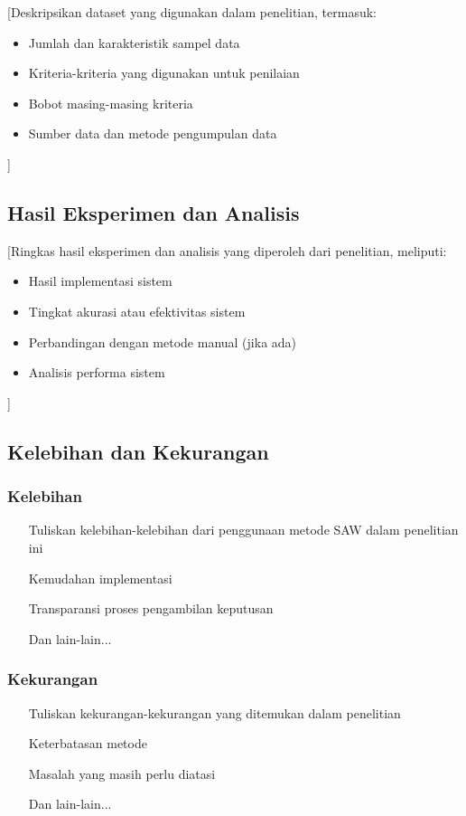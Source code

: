 \documentclass[10pt,a4paper]{article}
\begin{document}
[Deskripsikan dataset yang digunakan dalam penelitian, termasuk:
\begin{itemize}
    \item Jumlah dan karakteristik sampel data
    \item Kriteria-kriteria yang digunakan untuk penilaian
    \item Bobot masing-masing kriteria
    \item Sumber data dan metode pengumpulan data
\end{itemize}]

\subsection{Hasil Eksperimen dan Analisis}

[Ringkas hasil eksperimen dan analisis yang diperoleh dari penelitian, meliputi:
\begin{itemize}
    \item Hasil implementasi sistem
    \item Tingkat akurasi atau efektivitas sistem
    \item Perbandingan dengan metode manual (jika ada)
    \item Analisis performa sistem
\end{itemize}]

\subsection{Kelebihan dan Kekurangan}

\subsubsection{Kelebihan}
\begin{itemize}
    \item [Tuliskan kelebihan-kelebihan dari penggunaan metode SAW dalam penelitian ini]
    \item [Kemudahan implementasi]
    \item [Transparansi proses pengambilan keputusan]
    \item [Dan lain-lain...]
\end{itemize}

\subsubsection{Kekurangan}
\begin{itemize}
    \item [Tuliskan kekurangan-kekurangan yang ditemukan dalam penelitian]
    \item [Keterbatasan metode]
    \item [Masalah yang masih perlu diatasi]
    \item [Dan lain-lain...]
\end{itemize}
\end{document}
